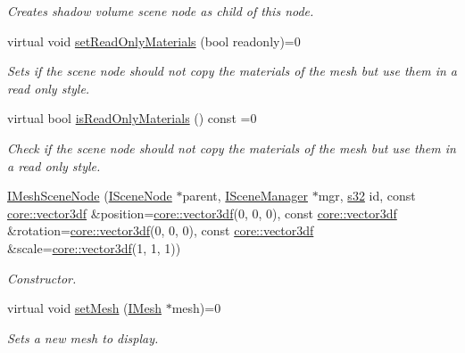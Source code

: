 \begin{DoxyCompactItemize}
\begin{DoxyCompactList}\small\item\em Creates shadow volume scene node as child of this node. \end{DoxyCompactList}\item 
virtual void \hyperlink{classirr_1_1scene_1_1IMeshSceneNode_a3bae73b4f7b1a6b265a62ece964c008f}{set\+Read\+Only\+Materials} (bool readonly)=0
\begin{DoxyCompactList}\small\item\em Sets if the scene node should not copy the materials of the mesh but use them in a read only style. \end{DoxyCompactList}\item 
virtual bool \hyperlink{classirr_1_1scene_1_1IMeshSceneNode_a1d7de4331b84480598f636c929418e3d}{is\+Read\+Only\+Materials} () const =0
\begin{DoxyCompactList}\small\item\em Check if the scene node should not copy the materials of the mesh but use them in a read only style. \end{DoxyCompactList}\item 
\hyperlink{classirr_1_1scene_1_1IMeshSceneNode_a491d6cac4ec270ab01c24e27c88e6ca4}{I\+Mesh\+Scene\+Node} (\hyperlink{classirr_1_1scene_1_1ISceneNode}{I\+Scene\+Node} $\ast$parent, \hyperlink{classirr_1_1scene_1_1ISceneManager}{I\+Scene\+Manager} $\ast$mgr, \hyperlink{namespaceirr_ac66849b7a6ed16e30ebede579f9b47c6}{s32} id, const \hyperlink{namespaceirr_1_1core_ae6e2b2a6c552833ebbd5b7463d03586b}{core\+::vector3df} \&position=\hyperlink{namespaceirr_1_1core_ae6e2b2a6c552833ebbd5b7463d03586b}{core\+::vector3df}(0, 0, 0), const \hyperlink{namespaceirr_1_1core_ae6e2b2a6c552833ebbd5b7463d03586b}{core\+::vector3df} \&rotation=\hyperlink{namespaceirr_1_1core_ae6e2b2a6c552833ebbd5b7463d03586b}{core\+::vector3df}(0, 0, 0), const \hyperlink{namespaceirr_1_1core_ae6e2b2a6c552833ebbd5b7463d03586b}{core\+::vector3df} \&scale=\hyperlink{namespaceirr_1_1core_ae6e2b2a6c552833ebbd5b7463d03586b}{core\+::vector3df}(1, 1, 1))
\begin{DoxyCompactList}\small\item\em Constructor. \end{DoxyCompactList}\item 
virtual void \hyperlink{classirr_1_1scene_1_1IMeshSceneNode_a8d7e98ddfb990bfc354c9c410a4d788f}{set\+Mesh} (\hyperlink{classirr_1_1scene_1_1IMesh}{I\+Mesh} $\ast$mesh)=0
\begin{DoxyCompactList}\small\item\em Sets a new mesh to display. \end{DoxyCompactList}\item 

\end{DoxyCompactItemize}
